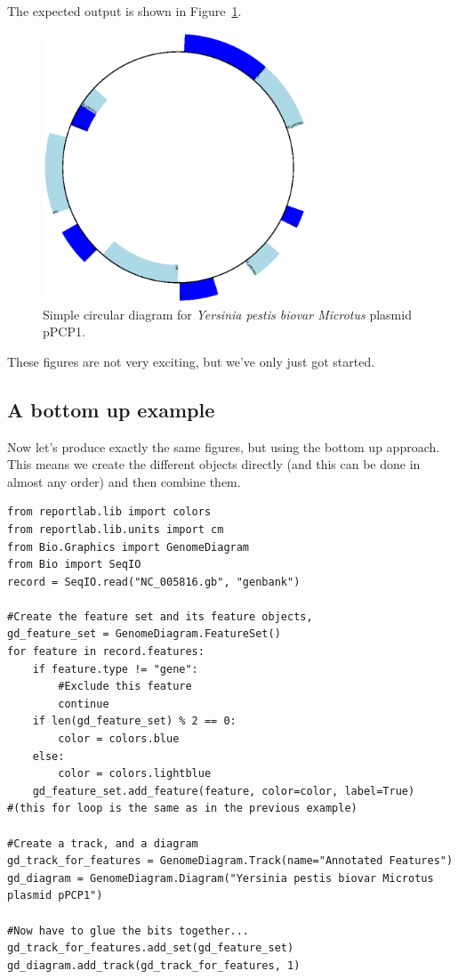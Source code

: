 \documentclass{report}
\begin{document}
\begin{htmlonly}

\end{htmlonly}
\begin{latexonly}
The expected output is shown in Figure~\ref{fig:plasmid_circular}.
\begin{figure}[htbp]
\centering
\includegraphics[width=8cm,height=8cm]{images/plasmid_circular.png}
\caption{Simple circular diagram for \textit{Yersinia pestis biovar Microtus} plasmid pPCP1.}
\label{fig:plasmid_circular}
\end{figure}
\end{latexonly}
These figures are not very exciting, but we've only just got started.

\subsection{A bottom up example}
Now let's produce exactly the same figures, but using the bottom up approach.
This means we create the different objects directly (and this can be done in
almost any order) and then combine them.

\begin{verbatim}
from reportlab.lib import colors
from reportlab.lib.units import cm
from Bio.Graphics import GenomeDiagram
from Bio import SeqIO
record = SeqIO.read("NC_005816.gb", "genbank")

#Create the feature set and its feature objects,
gd_feature_set = GenomeDiagram.FeatureSet()
for feature in record.features:
    if feature.type != "gene":
        #Exclude this feature
        continue
    if len(gd_feature_set) % 2 == 0:
        color = colors.blue
    else:
        color = colors.lightblue
    gd_feature_set.add_feature(feature, color=color, label=True)
#(this for loop is the same as in the previous example)

#Create a track, and a diagram
gd_track_for_features = GenomeDiagram.Track(name="Annotated Features")
gd_diagram = GenomeDiagram.Diagram("Yersinia pestis biovar Microtus plasmid pPCP1")

#Now have to glue the bits together...
gd_track_for_features.add_set(gd_feature_set)
gd_diagram.add_track(gd_track_for_features, 1)
\end{verbatim}
\end{document}
